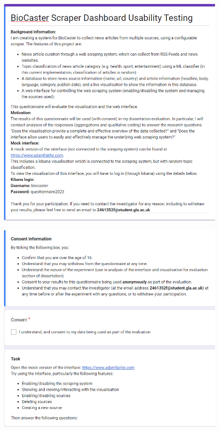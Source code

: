 \documentclass{l4proj}
\begin{document}
\begin{appendices}
 \begin{figure}[h]
\centering
\includegraphics[width=\textwidth]{images/Form1.png}
\end{figure}

 \begin{figure}[h]
\centering
\includegraphics[width=\textwidth]{images/Form2.png}
\end{figure}


\end{appendices}
\end{document}
